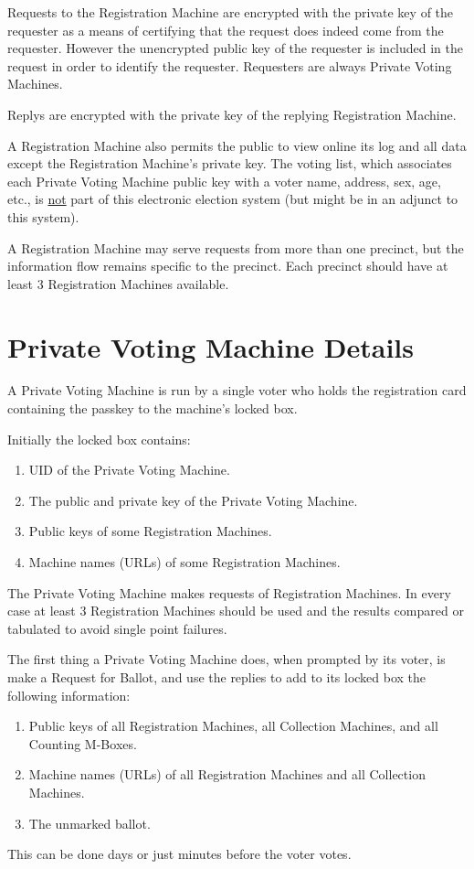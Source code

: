 \documentclass[12pt]{article}
\begin{document}
Requests to the Registration Machine are encrypted with the
private key of the requester as a means of certifying that
the request does indeed come from the requester.  However the
unencrypted public key of the requester is included in the
request in order to identify the requester.  Requesters are
always Private Voting Machines.

Replys are encrypted with the private key of the replying Registration Machine.

A Registration Machine also permits the public to view online
its log and all data except the Registration Machine's
private key.  The voting list, which associates each Private
Voting Machine public key with a voter name, address, sex,
age, etc., is \underline{not} part of this electronic
election system (but might be in an adjunct to this system).

A Registration Machine may serve requests from more than
one precinct, but the information flow remains specific
to the precinct.  Each precinct should have at least 3
Registration Machines available.

\section{Private Voting Machine Details}

A Private Voting Machine is run by a single voter
who holds the registration card containing the passkey to
the machine's locked box.

Initially the locked box contains:
\begin{enumerate}
\item UID of the Private Voting Machine.
\item The public and private key of the Private Voting Machine.
\item Public keys of some Registration Machines.
\item Machine names (URLs) of some Registration Machines.
\setcounter{PVM-COUNTER}{\value{enumi}}
\end{enumerate}

The Private Voting Machine
makes requests of Registration Machines.  In every case
at least 3 Registration Machines should be used and the
results compared or tabulated to avoid single point failures.

The first thing a Private Voting Machine does, when prompted by
its voter, is make a Request for Ballot, and use the replies to
add to its locked box the following information:
\begin{enumerate}
\setcounter{enumi}{\value{PVM-COUNTER}}
\item Public keys of all Registration Machines, all Collection
Machines, and all Counting M-Boxes.
\item Machine names (URLs) of all Registration Machines and all Collection
Machines.
\item The unmarked ballot.
\end{enumerate}
This can be done days or just minutes before the voter votes.
\end{document}

